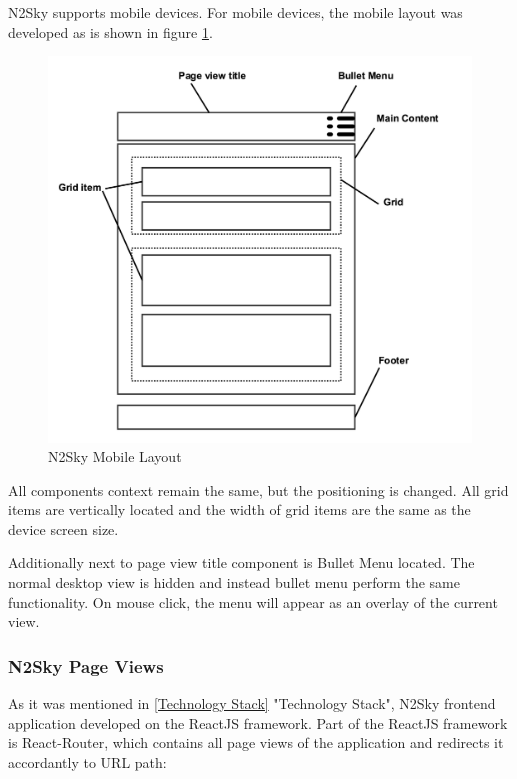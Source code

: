N2Sky supports mobile devices. For mobile devices, the mobile layout was developed as is shown in figure \ref{fig:layout_mobile}.

\begin{figure}[H]
\begin{center}
  \includegraphics[width=\linewidth]{components/3/components/layout_mobile.png}
  \caption{N2Sky Mobile Layout}
  \label{fig:layout_mobile}
\end{center}
\end{figure}

All components context remain the same, but the positioning is changed. All grid items are vertically located and the width of grid items are the same as the device screen size. 

Additionally next to page view title component is Bullet Menu located. The normal desktop view is hidden and instead bullet menu perform the same functionality. On mouse click, the menu will appear as an overlay of the current view. 

\subsubsection{N2Sky Page Views}\label{N2Sky Page Views}

As it was mentioned in \autoref{Technology Stack} "Technology Stack", N2Sky frontend application developed on the ReactJS framework. Part of the ReactJS framework is React-Router, which contains all page views of the application and redirects it accordantly to URL path:

